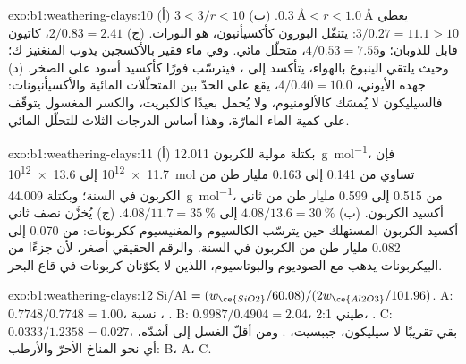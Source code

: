 \begin{solution}{exo:b1:weathering-clays:10}
(أ) $3 < 3/r < 10$ يعطي $\qty{0.3}{\angstrom} < r < \qty{1.0}{\angstrom}$.
(ب) $3/0.27 = 11.1 > 10$: يتنقّل البورون كأكسيأنيون، هو البورات. (ج) $2/0.83 =
2.41$، كاتيون قابل للذوبان؛ و$4/0.53 = 7.55$، متحلّل مائي. وفي ماء فقير بالأكسجين يذوب المنغنيز ك؛ وحيث يلتقي الينبوع بالهواء، يتأكسد إلى ، فيترسّب فورًا كأكسيد أسود على الصخر. (د) جهده الأيوني، $4/0.40 = 10.0$، يقع على الحدّ بين المتحلّلات المائية والأكسيأنيونات: فالسيليكون لا يُمسَك كالألومنيوم، ولا يُحمل بعيدًا كالكبريت، والكسر المغسول يتوقّف على كمية الماء المارّة، وهذا أساس الدرجات الثلاث للتحلّل المائي.
\end{solution}

\begin{solution}{exo:b1:weathering-clays:11}
(أ) بكتلة مولية للكربون \qty{12.011}{g.mol^{-1}}، فإن \num{11.7e12} إلى
\qty{13.6e12}{mol} تساوي من 0.141 إلى 0.163 مليار طن من الكربون في السنة؛ وبكتلة \qty{44.009}{g.mol^{-1}}، من 0.515 إلى 0.599 مليار طن من ثاني أكسيد الكربون. (ب) $4.08/13.6 = \qty{30}{\percent}$ إلى $4.08/11.7 = \qty{35}{\percent}$. (ج) يُخزَّن نصف ثاني أكسيد الكربون المستهلك حين يترسّب الكالسيوم والمغنيسيوم ككربونات: من 0.070 إلى 0.082 مليار طن من الكربون في السنة. والرقم الحقيقي أصغر، لأن جزءًا من البيكربونات يذهب مع الصوديوم والبوتاسيوم، اللذين لا يكوّنان كربونات في قاع البحر.
\end{solution}

\begin{solution}{exo:b1:weathering-clays:12}
Si/Al $= (w_{\ce{SiO2}}/60.08)/(2w_{\ce{Al2O3}}/101.96)$. A: $0.7748/0.7748 =
1.00$، نسبة ، . B: $0.9987/0.4904 = 2.04$،  طيني 2:1، . C: $0.0333/1.2358 = 0.027$، بقي تقريبًا لا سيليكون، جيبسيت، . ومن أقلّ الغسل إلى أشدّه، أي نحو المناخ الأحرّ والأرطب: B، A، C.
\end{solution}

